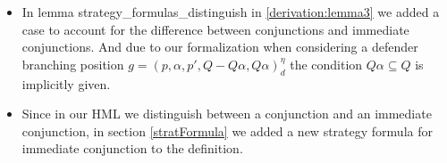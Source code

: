 \begin{itemize}
  \item In lemma strategy\_formulas\_distinguish in  \ref{derivation:lemma3} we added a case to account for the difference between 
  conjunctions and immediate conjunctions. And due to our formalization when considering a
  defender branching position $g=(p,\alpha ,p', Q - Q\alpha, Q\alpha)_d^\eta$ the condition 
  $Q \alpha \subseteq Q$ is implicitly given.
  
  \item Since in our HML we distinguish between a conjunction and an immediate conjunction, in section \ref{stratFormula} 
  we added a new strategy formula for immediate conjunction to the definition.
\end{itemize}
